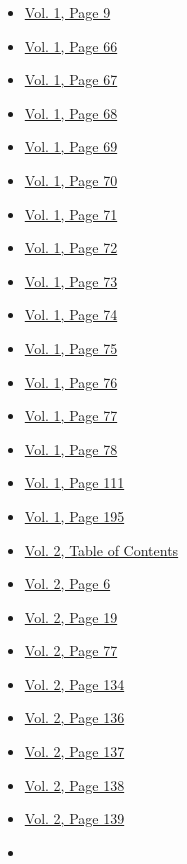 \begin{itemize}
  \begin{itemize}
  \tightlist
  \item
    \protect\hyperlink{g-page-17}{Vol. 1, Page 9}
  \item
    \protect\hyperlink{g-page-74}{Vol. 1, Page 66}
  \item
    \protect\hyperlink{g-page-75}{Vol. 1, Page 67}
  \item
    \protect\hyperlink{g-page-76}{Vol. 1, Page 68}
  \item
    \protect\hyperlink{g-page-77}{Vol. 1, Page 69}
  \item
    \protect\hyperlink{g-page-78}{Vol. 1, Page 70}
  \item
    \protect\hyperlink{g-page-79}{Vol. 1, Page 71}
  \item
    \protect\hyperlink{g-page-80}{Vol. 1, Page 72}
  \item
    \protect\hyperlink{g-page-81}{Vol. 1, Page 73}
  \item
    \protect\hyperlink{g-page-82}{Vol. 1, Page 74}
  \item
    \protect\hyperlink{g-page-83}{Vol. 1, Page 75}
  \item
    \protect\hyperlink{g-page-84}{Vol. 1, Page 76}
  \item
    \protect\hyperlink{g-page-85}{Vol. 1, Page 77}
  \item
    \protect\hyperlink{g-page-86}{Vol. 1, Page 78}
  \item
    \protect\hyperlink{g-page-119}{Vol. 1, Page 111}
  \item
    \protect\hyperlink{g-page-203}{Vol. 1, Page 195}
  \item
    \protect\hyperlink{g-page-211}{Vol. 2, Table of Contents}
  \item
    \protect\hyperlink{g-page-218}{Vol. 2, Page 6}
  \item
    \protect\hyperlink{g-page-231}{Vol. 2, Page 19}
  \item
    \protect\hyperlink{g-page-289}{Vol. 2, Page 77}
  \item
    \protect\hyperlink{g-page-346}{Vol. 2, Page 134}
  \item
    \protect\hyperlink{g-page-348}{Vol. 2, Page 136}
  \item
    \protect\hyperlink{g-page-349}{Vol. 2, Page 137}
  \item
    \protect\hyperlink{g-page-350}{Vol. 2, Page 138}
  \item
    \protect\hyperlink{g-page-351}{Vol. 2, Page 139}
  \item

\end{itemize}
\end{itemize}

